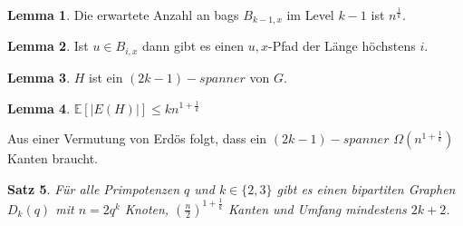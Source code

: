 \documentclass[a4paper, 12pt]{article}
\theoremstyle{plain}
\newtheorem{theorem}{Satz}[subsection] %
\theoremstyle{definition}
\theoremstyle{lemma}
\newtheorem{lemma}[theorem]{Lemma}
\theoremstyle{remark}
\theoremstyle{corollary}
\theoremstyle{example}
\begin{document}
	\begin{lemma}
		Die erwartete Anzahl an bags $B_{k-1,x}$ im Level $k-1$ ist $n^{\frac{1}{k}}$.
	\end{lemma}
	\begin{lemma}
		Ist $u \in B_{i,x}$ dann gibt es einen $u,x$-Pfad der Länge höchstens $i$.
	\end{lemma}
	\begin{lemma}
		$H$ ist ein $(2k-1)-spanner$ von $G$.
	\end{lemma}
	\begin{lemma}
		$\mathbb{E}[\left|E(H)\right|] \leq kn^{1+\frac{1}{k}}$
	\end{lemma}
	Aus einer Vermutung von Erdös folgt, dass ein $(2k-1)-spanner$ $\Omega(n^{1+\frac{1}{k}})$ Kanten braucht.
	\begin{theorem}
		Für alle Primpotenzen $q$ und $k \in \{2,3\}$ gibt es einen bipartiten Graphen $D_k(q)$ mit $n=2q^k$ Knoten, $(\frac{n}{2})^{1+\frac{1}{k}}$ Kanten und Umfang mindestens $2k+2$.
	\end{theorem}
\end{document}
